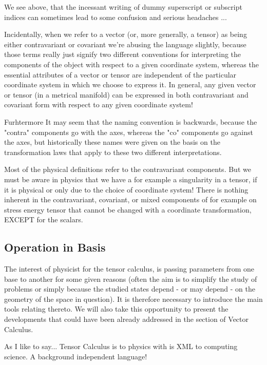 	\begin{tcolorbox}[title=Remark,colframe=black,arc=10pt]
	We see above, that the incessant writing  of dummy superscript or subscript indices  can sometimes lead to some confusion and serious headaches ...
	\end{tcolorbox}
	Incidentally, when we refer to a vector (or, more generally, a tensor) as being either contravariant or covariant we're abusing the language slightly, because those terms really just signify two different conventions for interpreting the components of the object with respect to a given coordinate system, whereas the essential attributes of a vector or tensor are independent of the particular coordinate system in which we choose to express it. In general, any given vector or tensor (in a metrical manifold) can be expressed in both contravariant and covariant form with respect to any given coordinate system!
	
	Furhtermore It may seem that the naming convention is backwards, because the "contra" components go with the axes, whereas the "co" components go against the axes, but historically these names were given on the basis on the transformation laws that apply to these two different interpretations.
	
	Most of the physical definitions refer to the contravariant components. But we must be aware in physics that we have a for example a singularity in a tensor, if it is physical or only due to the choice of coordinate system! There is nothing inherent in the contravariant, covariant, or mixed components of for example on stress energy tensor that cannot be changed with a coordinate transformation, EXCEPT for the scalars. 
	
	\pagebreak
	\subsection{Operation in Basis}
	The interest of physicist for the tensor calculus, is passing parameters from one base to another for some given reasons (often the aim is to simplify the study of problems or simply because the studied states depend - or may depend - on the geometry of the space in question). It is therefore necessary to introduce the main tools relating thereto. We will also take this opportunity to present the developments that could have been already addressed in the section of Vector Calculus.
	\begin{tcolorbox}[title=Remark,colframe=black,arc=10pt]
	As I like to say... Tensor Calculus is to physics with is XML to computing science. A background independent language!
	\end{tcolorbox}
	
